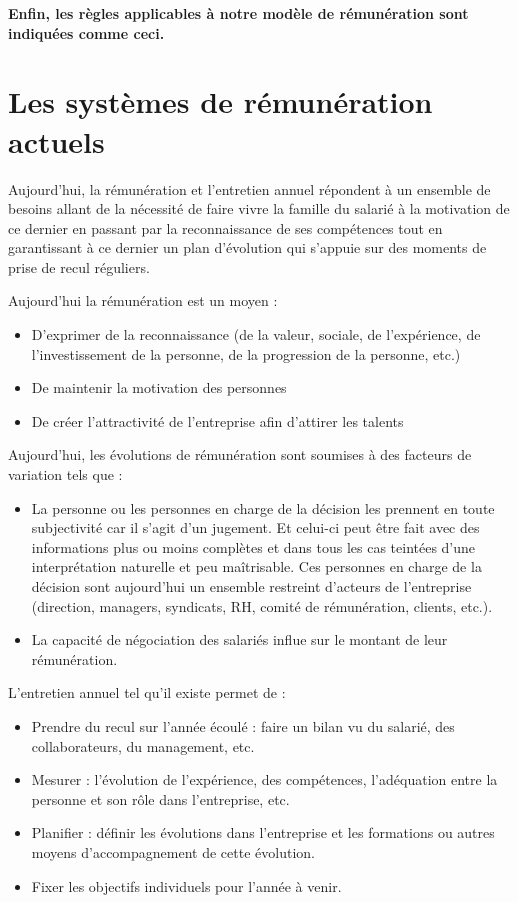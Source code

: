 \documentclass[12pt]{article}
\newcommand{\regle}[1]{%
  \textbf{#1}
}
\begin{document}
  \regle{Enfin, les règles applicables à notre modèle de rémunération sont indiquées comme ceci.}

\section{Les systèmes de rémunération actuels}
 Aujourd’hui, la rémunération et l'entretien annuel répondent à un ensemble de besoins allant de la nécessité de faire vivre la famille du salarié à la motivation de ce dernier en passant par la reconnaissance de ses compétences tout en garantissant à ce dernier un plan d’évolution qui s’appuie sur des moments de prise de recul réguliers.

Aujourd’hui la rémunération est un moyen :
 \begin{itemize}
   \item D’exprimer de la reconnaissance (de la valeur, sociale, de l’expérience, de l’investissement de la personne, de la progression de la personne, etc.)
   \item De maintenir la motivation des personnes
   \item De créer l’attractivité de l’entreprise afin d’attirer les talents
 \end{itemize}

Aujourd’hui, les évolutions de rémunération sont soumises à des facteurs de variation tels que :
 \begin{itemize}
   \item La personne ou les personnes en charge de la décision les prennent en toute subjectivité car il s’agit d’un jugement. Et celui-ci peut être fait avec des informations plus ou moins complètes et dans tous les cas teintées d’une interprétation naturelle et peu maîtrisable. Ces personnes en charge de la décision sont aujourd’hui un ensemble restreint d’acteurs de l’entreprise (direction, managers, syndicats, RH, comité de rémunération, clients, etc.).
   \item La capacité de négociation des salariés influe sur le montant de leur rémunération.
 \end{itemize}

L'entretien annuel tel qu’il existe permet de : 
 \begin{itemize}
   \item Prendre du recul sur l’année écoulé : faire un bilan vu du salarié, des collaborateurs, du management, etc.
   \item Mesurer : l’évolution de l’expérience, des compétences, l’adéquation entre la personne et son rôle dans l’entreprise, etc.
   \item Planifier : définir les évolutions dans l’entreprise et les formations ou autres moyens d'accompagnement de cette évolution.
   \item Fixer les objectifs individuels pour l’année à venir. 
 \end{itemize}
\end{document}
